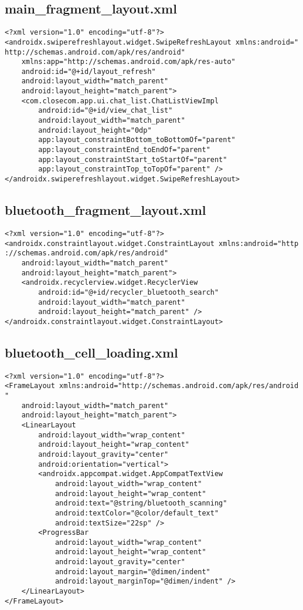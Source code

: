 \documentclass[listing]{espd}
\begin{document}
\subsection{main\_fragment\_layout.xml}
\begin{verbatim}
<?xml version="1.0" encoding="utf-8"?>
<androidx.swiperefreshlayout.widget.SwipeRefreshLayout xmlns:android="
http://schemas.android.com/apk/res/android"
    xmlns:app="http://schemas.android.com/apk/res-auto"
    android:id="@+id/layout_refresh"
    android:layout_width="match_parent"
    android:layout_height="match_parent">
    <com.closecom.app.ui.chat_list.ChatListViewImpl
        android:id="@+id/view_chat_list"
        android:layout_width="match_parent"
        android:layout_height="0dp"
        app:layout_constraintBottom_toBottomOf="parent"
        app:layout_constraintEnd_toEndOf="parent"
        app:layout_constraintStart_toStartOf="parent"
        app:layout_constraintTop_toTopOf="parent" />
</androidx.swiperefreshlayout.widget.SwipeRefreshLayout>
\end{verbatim}

\subsection{bluetooth\_fragment\_layout.xml}
\begin{verbatim}
<?xml version="1.0" encoding="utf-8"?>
<androidx.constraintlayout.widget.ConstraintLayout xmlns:android="http
://schemas.android.com/apk/res/android"
    android:layout_width="match_parent"
    android:layout_height="match_parent">
    <androidx.recyclerview.widget.RecyclerView
        android:id="@+id/recycler_bluetooth_search"
        android:layout_width="match_parent"
        android:layout_height="match_parent" />
</androidx.constraintlayout.widget.ConstraintLayout>
\end{verbatim}

\subsection{bluetooth\_cell\_loading.xml}
\begin{verbatim}
<?xml version="1.0" encoding="utf-8"?>
<FrameLayout xmlns:android="http://schemas.android.com/apk/res/android
"
    android:layout_width="match_parent"
    android:layout_height="match_parent">
    <LinearLayout
        android:layout_width="wrap_content"
        android:layout_height="wrap_content"
        android:layout_gravity="center"
        android:orientation="vertical">
        <androidx.appcompat.widget.AppCompatTextView
            android:layout_width="wrap_content"
            android:layout_height="wrap_content"
            android:text="@string/bluetooth_scanning"
            android:textColor="@color/default_text"
            android:textSize="22sp" />
        <ProgressBar
            android:layout_width="wrap_content"
            android:layout_height="wrap_content"
            android:layout_gravity="center"
            android:layout_margin="@dimen/indent"
            android:layout_marginTop="@dimen/indent" />
    </LinearLayout>
</FrameLayout>
\end{verbatim}
\end{document}
